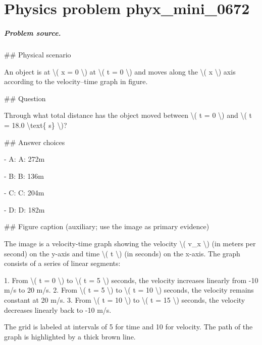 
\chapter{Physics problem phyx\_mini\_0672}
\label{ch:PhyXMiniProblems_problem_phyx_mini_0672}

\paragraph{Problem source.}
\#\# Physical scenario

An object is at \textbackslash{}( x = 0 \textbackslash{}) at \textbackslash{}( t = 0 \textbackslash{}) and moves along the \textbackslash{}( x \textbackslash{}) axis according to the velocity--time graph in figure.

\#\# Question

Through what total distance has the object moved between \textbackslash{}( t = 0 \textbackslash{}) and \textbackslash{}( t = 18.0 \textbackslash{}text\{ s\} \textbackslash{})?

\#\# Answer choices

- A: A: 272m

- B: B: 136m

- C: C: 204m

- D: D: 182m

\#\# Figure caption (auxiliary; use the image as primary evidence)

The image is a velocity-time graph showing the velocity \textbackslash{}( v\_x \textbackslash{}) (in meters per second) on the y-axis and time \textbackslash{}( t \textbackslash{}) (in seconds) on the x-axis. The graph consists of a series of linear segments:

1. From \textbackslash{}( t = 0 \textbackslash{}) to \textbackslash{}( t = 5 \textbackslash{}) seconds, the velocity increases linearly from -10 m/s to 20 m/s.
2. From \textbackslash{}( t = 5 \textbackslash{}) to \textbackslash{}( t = 10 \textbackslash{}) seconds, the velocity remains constant at 20 m/s.
3. From \textbackslash{}( t = 10 \textbackslash{}) to \textbackslash{}( t = 15 \textbackslash{}) seconds, the velocity decreases linearly back to -10 m/s.

The grid is labeled at intervals of 5 for time and 10 for velocity. The path of the graph is highlighted by a thick brown line.

